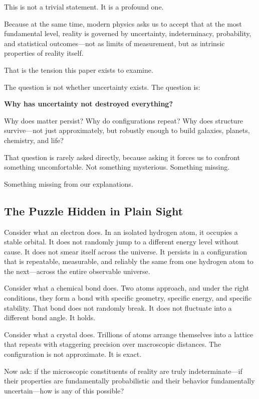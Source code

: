 \documentclass[12pt, a4paper]{article}
\begin{document}
This is not a trivial statement. It is a profound one.

Because at the same time, modern physics asks us to accept that at the most fundamental level, reality is governed by uncertainty, indeterminacy, probability, and statistical outcomes—not as limits of measurement, but as intrinsic properties of reality itself.

That is the tension this paper exists to examine.

The question is not whether uncertainty exists. The question is:

\textbf{Why has uncertainty not destroyed everything?}

Why does matter persist? Why do configurations repeat? Why does structure survive—not just approximately, but robustly enough to build galaxies, planets, chemistry, and life?

That question is rarely asked directly, because asking it forces us to confront something uncomfortable. Not something mysterious. Something missing.

Something missing from our explanations.

\subsection{The Puzzle Hidden in Plain Sight}

Consider what an electron does. In an isolated hydrogen atom, it occupies a stable orbital. It does not randomly jump to a different energy level without cause. It does not smear itself across the universe. It persists in a configuration that is repeatable, measurable, and reliably the same from one hydrogen atom to the next—across the entire observable universe.

Consider what a chemical bond does. Two atoms approach, and under the right conditions, they form a bond with specific geometry, specific energy, and specific stability. That bond does not randomly break. It does not fluctuate into a different bond angle. It holds.

Consider what a crystal does. Trillions of atoms arrange themselves into a lattice that repeats with staggering precision over macroscopic distances. The configuration is not approximate. It is exact.

Now ask: if the microscopic constituents of reality are truly indeterminate—if their properties are fundamentally probabilistic and their behavior fundamentally uncertain—how is any of this possible?
\end{document}
